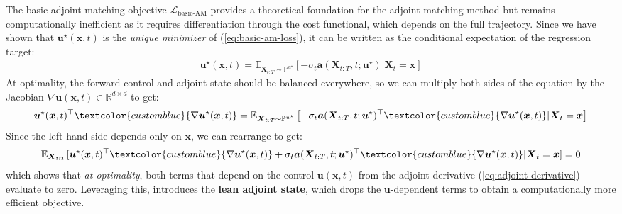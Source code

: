 \documentclass{article}
\newcommand{\boldtext}[1]{\textbf{\textcolor{MyGreen}{#1}}}
\newcommand{\bluetext}[1]{\textcolor{customblue}{#1}}
\begin{document}
The basic adjoint matching objective $\mathcal{L}_{\text{basic-AM}}$ provides a theoretical foundation for the adjoint matching method but remains computationally inefficient as it requires differentiation through the cost functional, which depends on the full trajectory. Since we have shown that $\boldsymbol{u}^\star(\boldsymbol{x},t)$ is the \textit{unique minimizer} of (\ref{eq:basic-am-loss}), it can be written as the conditional expectation of the regression target:
\begin{align}
    \boldsymbol{u}^\star(\boldsymbol{x},t)=\mathbb{E}_{\boldsymbol{X}_{t:T}\sim \mathbb{P}^{u^\star}}\left[-\sigma_t\boldsymbol{a}(\boldsymbol{X}_{t:T},t;\boldsymbol{u}^\star)|\boldsymbol{X}_t=\boldsymbol{x}\right]
\end{align}
At optimality, the forward control and adjoint state should be balanced everywhere, so we can multiply both sides of the equation by the Jacobian $\nabla \boldsymbol{u}(\boldsymbol{x},t)\in \mathbb{R}^{d\times d}$ to get:
\begin{align}
    \boldsymbol{u}^\star(\boldsymbol{x},t)^\top \bluetext{\nabla \boldsymbol{u}^\star(\boldsymbol{x},t)}=\mathbb{E}_{\boldsymbol{X}_{t:T}\sim \mathbb{P}^{u^\star}}\left[-\sigma_t\boldsymbol{a}(\boldsymbol{X}_{t:T},t;\boldsymbol{u}^\star)^\top\bluetext{ \nabla \boldsymbol{u}^\star(\boldsymbol{x},t)}|\boldsymbol{X}_t=\boldsymbol{x}\right]
\end{align}
Since the left hand side depends only on $\boldsymbol{x}$, we can rearrange to get:  
\begin{align}
    \mathbb{E}_{\boldsymbol{X}_{t:T}}[\boldsymbol{u}^\star(\boldsymbol{x},t)^\top \bluetext{\nabla \boldsymbol{u}^\star(\boldsymbol{x},t)}+\sigma_t\boldsymbol{a}(\boldsymbol{X}_{t:T},t;\boldsymbol{u}^\star)^\top\bluetext{ \nabla \boldsymbol{u}^\star(\boldsymbol{x},t)}|\boldsymbol{X}_t=\boldsymbol{x}]=0
\end{align}
which shows that \textit{at optimality}, both terms that depend on the control $\boldsymbol{u}(\boldsymbol{x},t)$ from the adjoint derivative (\ref{eq:adjoint-derivative}) evaluate to zero. Leveraging this, \citet{domingo2024adjoint} introduces the \boldtext{lean adjoint state}, which drops the $\boldsymbol{u}$-dependent terms to obtain a computationally more efficient objective.
\end{document}
